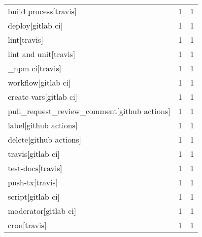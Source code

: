 \begin{tabular}{lrr}
build process[travis]                       &                   1 &             1 \\
deploy[gitlab ci]                           &                   1 &             1 \\
lint[travis]                                &                   1 &             1 \\
lint and unit[travis]                       &                   1 &             1 \\
\_npm ci[travis]                             &                   1 &             1 \\
workflow[gitlab ci]                         &                   1 &             1 \\
create-vars[gitlab ci]                      &                   1 &             1 \\
pull\_request\_review\_comment[github actions] &                   1 &             1 \\
label[github actions]                       &                   1 &             1 \\
delete[github actions]                      &                   1 &             1 \\
travis[gitlab ci]                           &                   1 &             1 \\
test-docs[travis]                           &                   1 &             1 \\
push-tx[travis]                             &                   1 &             1 \\
script[gitlab ci]                           &                   1 &             1 \\
moderator[gitlab ci]                        &                   1 &             1 \\
cron[travis]                                &                   1 &             1 \\
\bottomrule
\end{tabular}

